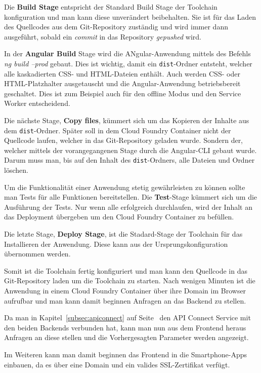 Die \textbf{Build Stage} entspricht der Standard Build Stage der Toolchain konfiguration und man kann diese unverändert
beibehalten. Sie ist für das Laden des Quellcodes aus dem Git-Repository zuständig und wird immer dann ausgeführt,
sobald ein \textit{commit} in das Repository \textit{gepushed} wird.

In der \textbf{Angular Build} Stage wird die ANgular-Anwendung mittels des Befehls \textit{ng build --prod} gebaut. Dies
ist wichtig, damit ein \texttt{dist}-Ordner entsteht, welcher alle kaskadierten CSS- und HTML-Dateien enthält. Auch
werden CSS- oder HTML-Platzhalter ausgetauscht und die Angular-Anwendung betriebsbereit geschaltet. Dies ist zum
Beispiel auch für den offline Modus und den Service Worker entscheidend.

Die nächste Stage, \textbf{Copy files}, kümmert sich um das Kopieren der Inhalte aus dem \texttt{dist}-Ordner. Später
soll in dem Cloud Foundry Container nicht der Quellcode laufen, welcher in das Git-Repository geladen wurde. Sondern
der, welcher mittels der vorangegangenen Stage durch die Angular-CLI gebaut wurde. Darum muss man, bis auf den Inhalt
des \texttt{dist}-Ordners, alle Dateien und Ordner löschen.

Um die Funktionalität einer Anwendung stetig gewährleisten zu können sollte man Tests für alle Funktionen bereitstellen.
Die \textbf{Test}-Stage kümmert sich um die Ausführung der Tests. Nur wenn alle erfolgreich durchlaufen, wird der Inhalt
an das Deployment übergeben um den Cloud Foundry Container zu befüllen.

Die letzte Stage, \textbf{Deploy Stage}, ist die Stadard-Stage der Toolchain für das Installieren der Anwendung. Diese
kann aus der Ursprungskonfiguration übernommen werden.

Somit ist die Toolchain fertig konfiguriert und man kann den Quellcode in das Git-Repository laden um die Toolchain zu
starten. Nach wenigen Minuten ist die Anwendung in einem Cloud Foundry Container über ihre Domain im Browser aufrufbar
und man kann damit beginnen Anfragen an das Backend zu stellen.

Da man in Kapitel~\ref{subsec:apiconnect} auf Seite~\pageref{subsec:apiconnect} den API Connect Service mit den beiden
Backends verbunden hat, kann man nun aus dem Frontend heraus Anfragen an diese stellen und die Vorhergesagten Parameter
werden angezeigt.

Im Weiteren kann man damit beginnen das Frontend in die Smartphone-Apps einbauen, da es über eine Domain und ein
valides SSL-Zertifikat verfügt.

